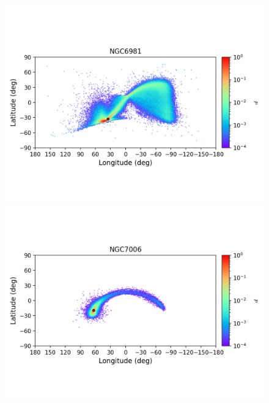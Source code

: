 \begin{figure}
\begin{center}
                \includegraphics[clip=true, trim = 0mm 20mm 0mm 10mm, width=1\columnwidth]{images/error_plots_NGC6981.png}
                \includegraphics[clip=true, trim = 0mm 20mm 0mm 10mm, width=1\columnwidth]{images/error_plots_NGC7006.png}
                

\end{center}
\end{figure}
